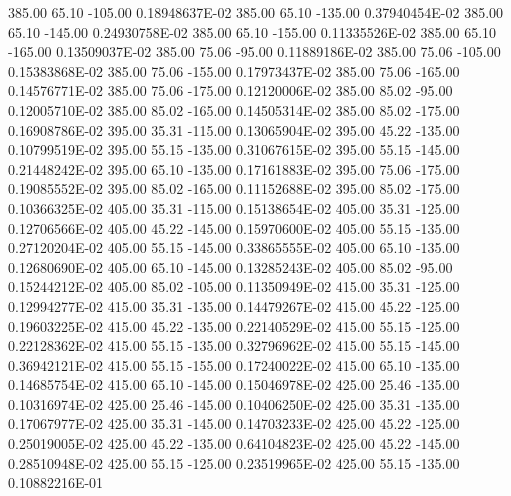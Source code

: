      385.00      65.10    -105.00      0.18948637E-02
     385.00      65.10    -135.00      0.37940454E-02
     385.00      65.10    -145.00      0.24930758E-02
     385.00      65.10    -155.00      0.11335526E-02
     385.00      65.10    -165.00      0.13509037E-02
     385.00      75.06     -95.00      0.11889186E-02
     385.00      75.06    -105.00      0.15383868E-02
     385.00      75.06    -155.00      0.17973437E-02
     385.00      75.06    -165.00      0.14576771E-02
     385.00      75.06    -175.00      0.12120006E-02
     385.00      85.02     -95.00      0.12005710E-02
     385.00      85.02    -165.00      0.14505314E-02
     385.00      85.02    -175.00      0.16908786E-02
     395.00      35.31    -115.00      0.13065904E-02
     395.00      45.22    -135.00      0.10799519E-02
     395.00      55.15    -135.00      0.31067615E-02
     395.00      55.15    -145.00      0.21448242E-02
     395.00      65.10    -135.00      0.17161883E-02
     395.00      75.06    -175.00      0.19085552E-02
     395.00      85.02    -165.00      0.11152688E-02
     395.00      85.02    -175.00      0.10366325E-02
     405.00      35.31    -115.00      0.15138654E-02
     405.00      35.31    -125.00      0.12706566E-02
     405.00      45.22    -145.00      0.15970600E-02
     405.00      55.15    -135.00      0.27120204E-02
     405.00      55.15    -145.00      0.33865555E-02
     405.00      65.10    -135.00      0.12680690E-02
     405.00      65.10    -145.00      0.13285243E-02
     405.00      85.02     -95.00      0.15244212E-02
     405.00      85.02    -105.00      0.11350949E-02
     415.00      35.31    -125.00      0.12994277E-02
     415.00      35.31    -135.00      0.14479267E-02
     415.00      45.22    -125.00      0.19603225E-02
     415.00      45.22    -135.00      0.22140529E-02
     415.00      55.15    -125.00      0.22128362E-02
     415.00      55.15    -135.00      0.32796962E-02
     415.00      55.15    -145.00      0.36942121E-02
     415.00      55.15    -155.00      0.17240022E-02
     415.00      65.10    -135.00      0.14685754E-02
     415.00      65.10    -145.00      0.15046978E-02
     425.00      25.46    -135.00      0.10316974E-02
     425.00      25.46    -145.00      0.10406250E-02
     425.00      35.31    -135.00      0.17067977E-02
     425.00      35.31    -145.00      0.14703233E-02
     425.00      45.22    -125.00      0.25019005E-02
     425.00      45.22    -135.00      0.64104823E-02
     425.00      45.22    -145.00      0.28510948E-02
     425.00      55.15    -125.00      0.23519965E-02
     425.00      55.15    -135.00      0.10882216E-01
